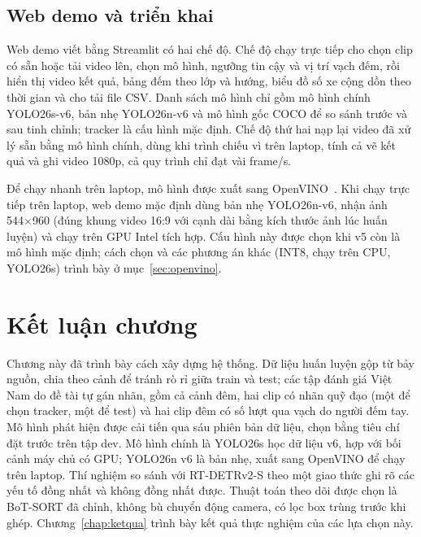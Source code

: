 \subsection{Web demo và triển khai}

Web demo viết bằng Streamlit có hai chế độ. Chế độ chạy trực tiếp cho chọn clip có sẵn hoặc tải video lên, chọn mô hình,
ngưỡng tin cậy và vị trí vạch đếm, rồi hiển thị video kết quả, bảng đếm theo lớp và hướng, biểu đồ số xe cộng dồn theo
thời gian và cho tải file CSV. Danh sách mô hình chỉ gồm mô hình chính YOLO26s-v6, bản nhẹ YOLO26n-v6 và mô hình gốc
COCO để so sánh trước và sau tinh chỉnh; tracker là cấu hình mặc định. Chế độ thứ hai nạp lại video đã xử lý sẵn bằng
mô hình chính, dùng khi trình chiếu vì trên laptop, tính cả vẽ kết quả và ghi video 1080p, cả quy trình chỉ đạt vài
frame/s.

Để chạy nhanh trên laptop, mô hình được xuất sang OpenVINO~\cite{openvino}. Khi chạy trực tiếp trên laptop, web demo mặc
định dùng bản nhẹ YOLO26n-v6, nhận ảnh 544×960 (đúng khung video 16:9 với cạnh dài bằng kích thước ảnh lúc huấn luyện)
và chạy trên GPU Intel tích hợp. Cấu hình này được chọn khi v5 còn là mô hình mặc định; cách chọn và các phương án khác
(INT8, chạy trên CPU, YOLO26s) trình bày ở mục~\ref{sec:openvino}.

\section{Kết luận chương}

Chương này đã trình bày cách xây dựng hệ thống. Dữ liệu huấn luyện gộp từ bảy nguồn, chia theo cảnh để tránh rò rỉ giữa
train và test; các tập đánh giá Việt Nam do đề tài tự gán nhãn, gồm cả cảnh đêm, hai clip có nhãn quỹ đạo (một để chọn
tracker, một để test) và hai clip đêm có số lượt qua vạch do người đếm tay. Mô hình phát hiện được cải tiến qua sáu
phiên bản dữ liệu, chọn bằng tiêu chí đặt trước trên tập dev. Mô hình chính là YOLO26s học dữ liệu v6, hợp với bối cảnh
máy chủ có GPU; YOLO26n v6 là bản nhẹ, xuất sang OpenVINO để chạy trên laptop. Thí nghiệm so sánh với RT-DETRv2-S theo
một giao thức ghi rõ các yếu tố đồng nhất và không đồng nhất được. Thuật toán theo dõi được chọn là BoT-SORT đã chỉnh,
không bù chuyển động camera, có lọc box trùng trước khi ghép. Chương~\ref{chap:ketqua} trình bày kết quả thực nghiệm của
các lựa chọn này.
